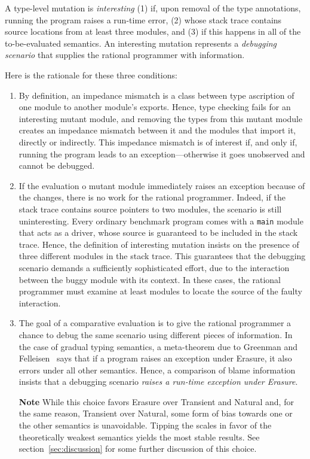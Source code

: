 
A type-level mutation is {\em interesting\/} (1) if, upon removal of the type
annotations, running the program raises a run-time error, (2) whose stack trace
contains source locations from at least three modules, and (3) if this happens
in all of the to-be-evaluated semantics. An interesting mutation represents a
{\em debugging scenario\/} that supplies the rational programmer with
information.

Here is the rationale for these three conditions:
\begin{enumerate}

\item By definition, an impedance mismatch is a class between type ascription of
one module to another module's exports. Hence, type checking fails for an
interesting mutant module, and removing the types from this mutant module
creates an impedance mismatch between it and the modules that import it,
directly or indirectly. This impedance mismatch is of interest if, and only if,
running the program leads to an exception---otherwise it goes unobserved and
cannot be debugged.

\item If the evaluation o mutant module immediately raises an exception because
of the changes, there is no work for the rational programmer. Indeed, if the
stack trace contains source pointers to two modules, the scenario is still
uninteresting. Every ordinary benchmark program comes with a {\tt main} module
that acts as a driver, whose source is guaranteed to be included in the stack
trace.  Hence, the definition of interesting mutation insists on the presence of
three different modules in the stack trace. This guarantees that the debugging
scenario demands a sufficiently sophisticated effort, due to the interaction
between the buggy module with its context.  In these cases, the rational
programmer must examine at least modules to locate the source of the faulty
interaction.

\item The goal of a comparative evaluation is to give the rational programmer a
chance to debug the same scenario using different pieces of information.  In the
case of gradual typing semantics, a meta-theorem due to Greenman and
Felleisen~\cite{gf-icfp-2018} says that if a program raises an exception under
Erasure, it also errors under all other semantics.  Hence, a comparison of blame
information insists that a debugging scenario {\em raises a run-time exception
under Erasure\/}.

{\bf Note} While this choice favors Erasure over Transient and Natural and, for
the same reason, Transient over Natural, some form of bias towards one or the
other semantics is unavoidable. Tipping the scales in favor of the theoretically
weakest semantics yields the most stable results. See
section~\ref{sec:discussion} for some further discussion of this choice.

\end{enumerate}

